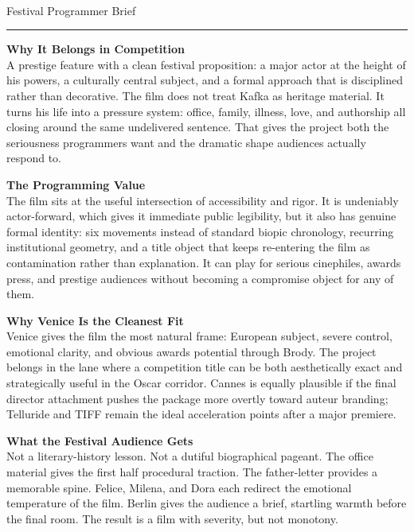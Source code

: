 \documentclass[11pt,letterpaper]{article}
\begin{document}
\begin{center}
{\Large\bfseries\sffamily \filmtitleupper}\\[3pt]
{\normalsize\sffamily\color{kafkagray} Festival Programmer Brief}
\end{center}
\vspace{2pt}
\textcolor{sectionrule}{\rule{\textwidth}{0.5pt}}
\vspace{4pt}

\textbf{Why It Belongs in Competition}\\
A prestige feature with a clean festival proposition: a major actor at the height of his powers, a culturally central subject, and a formal approach that is disciplined rather than decorative. The film does not treat Kafka as heritage material. It turns his life into a pressure system: office, family, illness, love, and authorship all closing around the same undelivered sentence. That gives the project both the seriousness programmers want and the dramatic shape audiences actually respond to.

\vspace{2pt}

\textbf{The Programming Value}\\
The film sits at the useful intersection of accessibility and rigor. It is undeniably actor-forward, which gives it immediate public legibility, but it also has genuine formal identity: six movements instead of standard biopic chronology, recurring institutional geometry, and a title object that keeps re-entering the film as contamination rather than explanation. It can play for serious cinephiles, awards press, and prestige audiences without becoming a compromise object for any of them.

\vspace{2pt}

\textbf{Why Venice Is the Cleanest Fit}\\
Venice gives the film the most natural frame: European subject, severe control, emotional clarity, and obvious awards potential through Brody. The project belongs in the lane where a competition title can be both aesthetically exact and strategically useful in the Oscar corridor. Cannes is equally plausible if the final director attachment pushes the package more overtly toward auteur branding; Telluride and TIFF remain the ideal acceleration points after a major premiere.

\vspace{2pt}

\textbf{What the Festival Audience Gets}\\
Not a literary-history lesson. Not a dutiful biographical pageant. The office material gives the first half procedural traction. The father-letter provides a memorable spine. Felice, Milena, and Dora each redirect the emotional temperature of the film. Berlin gives the audience a brief, startling warmth before the final room. The result is a film with severity, but not monotony.
\end{document}
